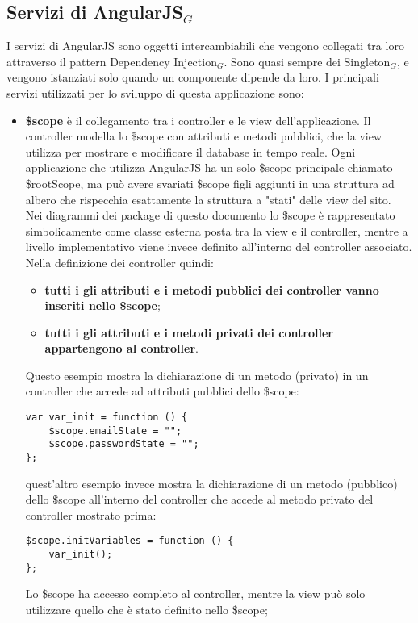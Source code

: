 \subsection{Servizi di AngularJS$_G$} \label{servizi}
I servizi di AngularJS sono oggetti intercambiabili che vengono collegati tra loro attraverso il pattern Dependency Injection$_G$. Sono quasi sempre dei Singleton$_G$, e vengono istanziati solo quando un componente dipende da loro.
I principali servizi utilizzati per lo sviluppo di questa applicazione sono:
\begin{itemize}
\item \textbf{\$scope} è il collegamento tra i controller e le view dell'applicazione. Il controller modella lo \$scope con attributi e metodi pubblici, che la view utilizza per mostrare e modificare il database in tempo reale. Ogni applicazione che utilizza AngularJS ha un solo \$scope principale chiamato \$rootScope, ma può avere svariati \$scope figli aggiunti in una struttura ad albero che rispecchia esattamente la struttura a "stati" delle view del sito. \\
Nei diagrammi dei package di questo documento lo \$scope è rappresentato simbolicamente come classe esterna posta tra la view e il controller, mentre a livello implementativo viene invece definito all'interno del controller associato. Nella definizione dei controller quindi: 
\begin{itemize}
\item \textbf{tutti i gli attributi e i metodi pubblici dei controller vanno inseriti nello \$scope};
\item \textbf{tutti i gli attributi e i metodi privati dei controller appartengono al controller}.
\end{itemize}
Questo esempio mostra la dichiarazione di un metodo (privato) in un controller che accede ad attributi pubblici dello \$scope:
\color{blue}\begin{lstlisting}[frame=single]
var var_init = function () {
	$scope.emailState = "";
	$scope.passwordState = "";
};
\end{lstlisting}\color{black}
quest'altro esempio invece mostra la dichiarazione di un metodo (pubblico) dello \$scope all'interno del controller che accede al metodo privato del controller mostrato prima:
\color{blue}\begin{lstlisting}[frame=single]
$scope.initVariables = function () {
	var_init();
};
\end{lstlisting}\color{black}
Lo \$scope ha accesso completo al controller, mentre la view può solo utilizzare quello che è stato definito nello \$scope;

\end{itemize}
